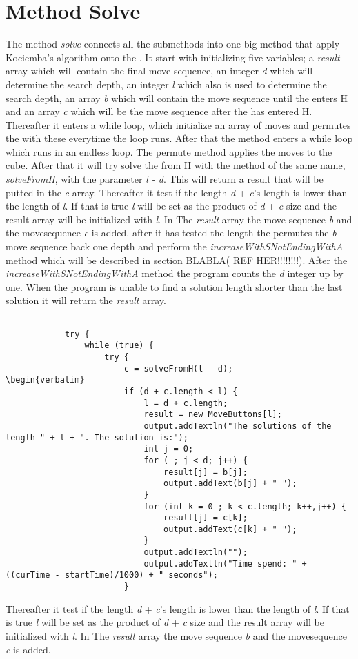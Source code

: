 \section{Method Solve}

The method \textit{solve} connects all the submethods into one big method that apply Kociemba's algorithm onto the \rubik{}. It start with initializing five variables; a \textit{result} array which will contain the final move sequence, an integer \textit{d} which will determine the search depth, an integer \textit{l} which also is used to determine the search depth, an array \textit{b} which will contain the move sequence until the \rubik{} enters H and an array \textit{c} which will be the move sequence after the \rubik{} has entered H. Thereafter it enters a while loop, which initialize an array of moves and permutes the \rubik{} with these everytime the loop runs. After that the method enters a while loop which runs in an endless loop. The permute method applies the moves to the cube. After that it will try solve the \rubik{} from H with the method of the same name, \textit{solveFromH}, with the parameter \textit{l - d}.  This will return a result that will be putted in the \textit{c} array. Thereafter it test if the length \textit{d} + \textit{c}'s length is lower than the length of \textit{l}. If that is true \textit{l} will be set as the product of \textit{d} + \textit{c} size and the result array will be initialized with \textit{l}. In The \textit{result} array the move sequence \textit{b} and the movesequence \textit{c} is added. after it has tested the length the \rubik{}  permutes the \textit{b} move sequence back one depth and perform the \textit{increaseWithSNotEndingWithA} method which will be described in section BLABLA( REF HER!!!!!!!!). After the  \textit{increaseWithSNotEndingWithA} method the program counts the \textit{d} integer up by one. When the program is unable to find a solution length shorter than the last solution it will return the \textit{result} array.


\begin{verbatim}
			
			try {
				while (true) {
					try {
						c = solveFromH(l - d);
\begin{verbatim}
						if (d + c.length < l) {
							l = d + c.length;
							result = new MoveButtons[l];
							output.addTextln("The solutions of the length " + l + ". The solution is:");
							int j = 0;
							for ( ; j < d; j++) {
								result[j] = b[j];
								output.addText(b[j] + " ");
							}
							for (int k = 0 ; k < c.length; k++,j++) {
								result[j] = c[k];
								output.addText(c[k] + " ");
							}
							output.addTextln("");
							output.addTextln("Time spend: " + ((curTime - startTime)/1000) + " seconds");
						}
\end{verbatim}
Thereafter it test if the length \textit{d} + \textit{c}'s length is lower than the length of \textit{l}. If that is true \textit{l} will be set as the product of \textit{d} + \textit{c} size and the result array will be initialized with \textit{l}. In The \textit{result} array the move sequence \textit{b} and the movesequence \textit{c} is added.


